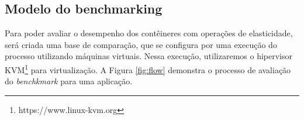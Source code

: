\documentclass[twoside,english,brazilian]{UNISINOSartigo}
\begin{document}

\subsection{Modelo do benchmarking}

Para poder avaliar o desempenho dos contêineres com operações de elasticidade, será criada uma base de comparação, que se configura por uma execução do processo utilizando máquinas virtuais. Nessa execução, utilizaremos o hipervisor KVM\footnote{https://www.linux-kvm.org} para virtualização. A Figura \ref{fig:flow} demonstra o processo de avaliação do \textit{benchkmark} para uma aplicação.
\end{document}
